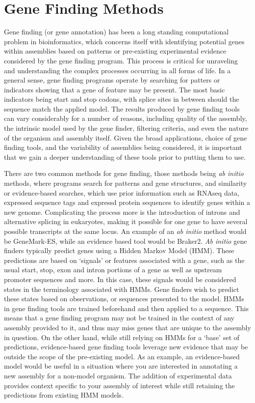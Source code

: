 \section{Gene Finding Methods}
Gene finding (or gene annotation) has been a long standing
computational problem in bioinformatics, which concerns itself with
identifying potential genes within assemblies based on patterns or
pre-existing experimental evidence considered by the gene finding
program. This process is critical for unraveling and understanding the
complex processes occurring in all forms of life. In a general sense,
gene finding programs operate by searching for patters or indicators
showing that a gene of feature may be present. The most basic
indicators being start and stop codons, with splice sites in
between should the sequence match the applied model. The results
produced by gene finding tools can vary considerably for a number of
reasons, including quality of the assembly, the intrinsic model used
by the gene finder, filtering criteria, and even the nature of the
organism and assembly itself. Given the broad applications, choice of
gene finding tools, and the variability of assemblies being
considered, it is important that we gain a deeper understanding of
these tools prior to putting them to use.

There are two common methods for gene finding, those methods being
\textit{ab initio} methods, where programs search for patterns and
gene structures, and similarity or evidence-based searches, which use
prior information such as RNAseq data, expressed sequence tags and
expressd protein sequences to identify genes within a new
genome\cite{Ejigu2020}. Complicating the process more is the
introduction of introns and alternative splicing in eukaryotes, making
it possible for one gene to have several possible transcripts at the
same locus. An example of an \textit{ab initio} method would be
GeneMark-ES\cite{10.1093/nar/gki937}, while an evidence based tool
would be Braker2\cite{Bruna2021}.
\textit{Ab initio} gene finders typically predict genes using a Hidden
Markov Model (HMM)\cite{Ejigu2020}. These predictions are based on
`signals' or features associated with a gene, such as the usual start,
stop, exon and intron portions of a gene as well as upstream promoter
sequences and more. In this case, these signals would be considered
states in the terminology associated with HMMs. Gene finders wish to
predict these states based on observations, or sequences presented to
the model. HMMs in gene finding tools are trained beforehand and then
applied to a sequence. This means that a gene finding program may not
be trained in the context of any assembly provided to it, and thus may
miss genes that are unique to the assembly in question.
On the other hand, while still relying on HMMs for a `base' set of
predictions, evidence-based gene finding tools leverage new evidence
that may be outside the scope of the pre-existing
model\cite{Keller2011}.  As an example, an evidence-based model would
be useful in a situation where you are interested in annotating a new
assembly for a non-model organism. The addition of experimental data
provides context specific to your assembly of interest while still
retaining the predictions from existing HMM models.

